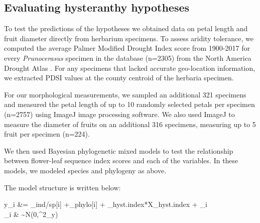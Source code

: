 \documentclass{article}[11pt]
\begin{document}
\subsection{Evaluating hysteranthy hypotheses}

To test the predictions of the hypotheses we obtained data on petal length and fruit diameter directly from herbarium specimens. To assess aridity tolerance, we computed the average Palmer Modified Drought Index score from 1900-2017 for every \textit{Prunocerasus} specimen in the database (n=2305) from the North America Drought Atlas \citep{Cook2004}. For any specimens that lacked accurate geo-location information, we extracted PDSI values at the county centroid of the herbaria specimen. 

\noindent For our morphological measurements, we sampled an additional 321 specimens and measured the petal length of up to 10 randomly selected petals per specimen (n=2757) using ImageJ image processing software. We also used ImageJ to measure the diameter of fruits on an additional 316 specimens, measuring up to 5 fruit per specimen (n=224).

We then used Bayesian phylogenetic mixed models to test the relationship between flower-leaf sequence index scores and each of the variables. In these models, we modeled species and phylogeny as above. 

The model structure is written below: 

  y_i &= \alpha_{ind/sp[i]} +\alpha_{phylo[i]} + \beta_{hyst.index}*X_{hyst.index} + \epsilon_i\\
  
  \epsilon_i & \sim N(0,\sigma^2_y) \\ %
  
\end{document}

